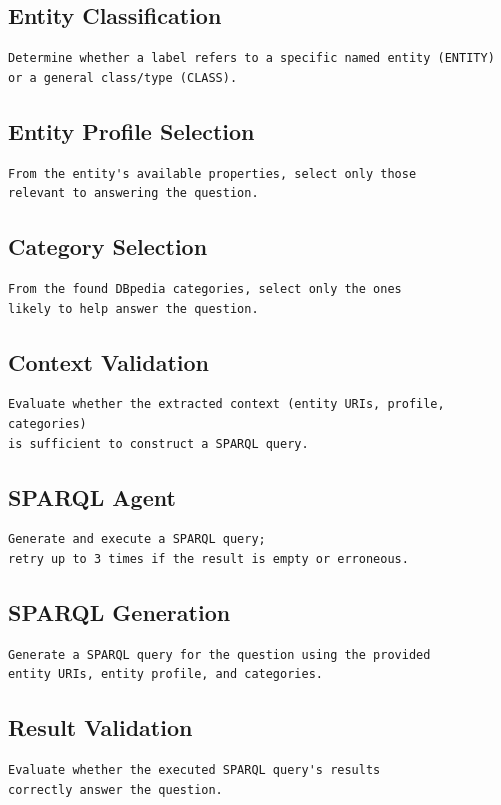\documentclass[11pt,a4paper]{article}
\begin{document}
\subsection*{Entity Classification}
\begin{lstlisting}[style=shortprompt]
Determine whether a label refers to a specific named entity (ENTITY)
or a general class/type (CLASS).
\end{lstlisting}
\subsection*{Entity Profile Selection}
\begin{lstlisting}[style=shortprompt]
From the entity's available properties, select only those
relevant to answering the question.
\end{lstlisting}
\subsection*{Category Selection}
\begin{lstlisting}[style=shortprompt]
From the found DBpedia categories, select only the ones
likely to help answer the question.
\end{lstlisting}
\subsection*{Context Validation}
\begin{lstlisting}[style=shortprompt]
Evaluate whether the extracted context (entity URIs, profile, categories)
is sufficient to construct a SPARQL query.
\end{lstlisting}
\subsection*{SPARQL Agent}
\begin{lstlisting}[style=shortprompt]
Generate and execute a SPARQL query;
retry up to 3 times if the result is empty or erroneous.
\end{lstlisting}
\subsection*{SPARQL Generation}
\begin{lstlisting}[style=shortprompt]
Generate a SPARQL query for the question using the provided
entity URIs, entity profile, and categories.
\end{lstlisting}
\subsection*{Result Validation}
\begin{lstlisting}[style=shortprompt]
Evaluate whether the executed SPARQL query's results
correctly answer the question.
\end{lstlisting}
\end{document}
